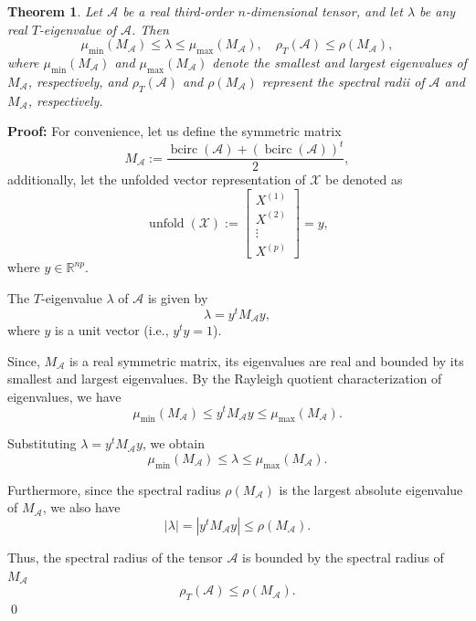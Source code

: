 \documentclass[oupthm]{CUP-JNL-BCM}%
\theoremstyle{oupplain}
\newtheorem{theorem}{Theorem}[section]
\theoremstyle{oupdefinition}
\theoremstyle{oupremark}
\theoremstyle{oupproof}
\numberwithin{equation}{section}
\begin{document}
\begin{theorem}\label{eigenboundma}
Let \(\mathcal{A}\) be a real third-order \(n\)-dimensional tensor, and let \(\lambda\) be any real \(T\)-eigenvalue of \(\mathcal{A}\). Then
\[
\mu_{\min}\left(M_{\mathcal{A}}\right) \leq \lambda \leq \mu_{\max}\left(M_{\mathcal{A}}\right), \quad \rho_T(\mathcal{A}) \leq \rho\left(M_{\mathcal{A}}\right),
\]  
where \(\mu_{\min}(M_{\mathcal{A}})\) and \(\mu_{\max}(M_{\mathcal{A}})\) denote the smallest and largest eigenvalues of \(M_{\mathcal{A}}\), respectively, and \(\rho_T(\mathcal{A})\) and \(\rho(M_{\mathcal{A}})\) represent the spectral radii of \(\mathcal{A}\) and \(M_{\mathcal{A}}\), respectively.  
\end{theorem}  

\noindent \textbf{Proof:}  For convenience, let us define the symmetric matrix
\[
M_{\mathcal{A}} := \frac{\operatorname{bcirc}(\mathcal{A}) + (\operatorname{bcirc}(\mathcal{A}))^t}{2},  
\]  
% 
additionally, let the unfolded vector representation of \(\mathcal{X}\) be denoted as
\[
\operatorname{unfold}(\mathcal{X}) := \begin{bmatrix}  
X^{(1)} \\  
X^{(2)} \\  
\vdots \\  
X^{(p)}  
\end{bmatrix} = y,  
\]  
where \(y \in \mathbb{R}^{np}\).  

\noindent The \(T\)-eigenvalue \(\lambda\) of \(\mathcal{A}\) is given by
\[
\lambda = y^t M_{\mathcal{A}} y,  
\]  
where \(y\) is a unit vector (i.e., \(y^t y = 1\)).  

\noindent Since, \(M_{\mathcal{A}}\) is a real symmetric matrix, its eigenvalues are real and bounded by its smallest and largest eigenvalues. By the Rayleigh quotient characterization of eigenvalues, we have
\[
\mu_{\min}(M_{\mathcal{A}}) \leq y^t M_{\mathcal{A}} y \leq \mu_{\max}(M_{\mathcal{A}}).  
\]  

\noindent Substituting \(\lambda = y^t M_{\mathcal{A}} y\), we obtain
\[
\mu_{\min}(M_{\mathcal{A}}) \leq \lambda \leq \mu_{\max}(M_{\mathcal{A}}).  
\]  

\noindent Furthermore, since the spectral radius \(\rho(M_{\mathcal{A}})\) is the largest absolute eigenvalue of \(M_{\mathcal{A}}\), we also have
\[
|\lambda| = |y^t M_{\mathcal{A}} y| \leq \rho(M_{\mathcal{A}}).  
\]  

\noindent Thus, the spectral radius of the tensor \(\mathcal{A}\) is bounded by the spectral radius of \(M_{\mathcal{A}}\)  
\[
\rho_T(\mathcal{A}) \leq \rho(M_{\mathcal{A}}).  
\]  
\hfill \qed 
\end{document}
